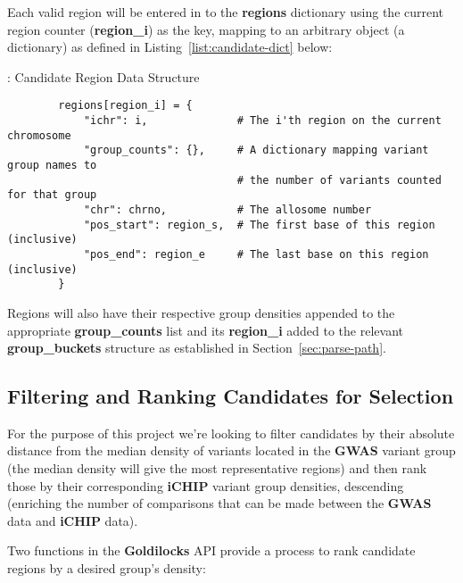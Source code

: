 Each valid region will be entered in to the \textbf{regions} dictionary using
the current region counter (\textbf{region\_i}) as the key, mapping to an
arbitrary object (a dictionary) as defined in Listing~\ref{list:candidate-dict}
below:

\begin{listing}[H]
    \caption[candidate-dict]{: Candidate Region Data Structure}
    \label{list:candidate-dict}
    \begin{verbatim}
        regions[region_i] = {
            "ichr": i,              # The i'th region on the current chromosome
            "group_counts": {},     # A dictionary mapping variant group names to
                                    # the number of variants counted for that group
            "chr": chrno,           # The allosome number
            "pos_start": region_s,  # The first base of this region (inclusive)
            "pos_end": region_e     # The last base on this region (inclusive)
        }
    \end{verbatim}
\end{listing}

Regions will also have their respective group densities appended to the
appropriate \textbf{group\_counts} list and its \textbf{region\_i} added to the
relevant \textbf{group\_buckets} structure as established in
Section~\ref{sec:parse-path}.


\subsection{Filtering and Ranking Candidates for Selection}
\label{sec:filter-rank}

For the purpose of this project we're looking to filter candidates by their
absolute distance from the median density of variants located in the
\textbf{GWAS} variant group (the median density will give the most representative
regions) and then rank those by their corresponding \textbf{iCHIP} variant group
densities, descending (enriching the number of comparisons that can be made
between the \textbf{GWAS} data and \textbf{iCHIP} data).

Two functions in the \textbf{Goldilocks} API provide a process to rank candidate
regions by a desired group's density:


